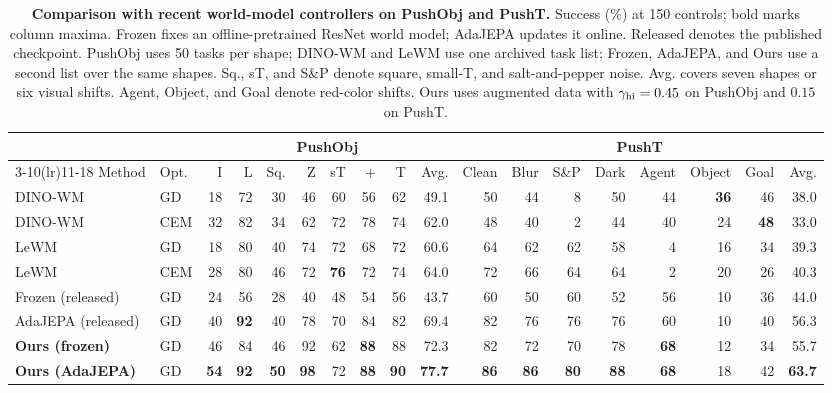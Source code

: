 \begin{table}[t]
\centering
\caption{\textbf{Comparison with recent world-model controllers on PushObj and PushT.} Success (\%) at 150 controls; bold marks column maxima. Frozen fixes an offline-pretrained ResNet world model; AdaJEPA updates it online. Released denotes the published checkpoint. PushObj uses 50 tasks per shape; DINO-WM and LeWM use one archived task list; Frozen, AdaJEPA, and Ours use a second list over the same shapes. Sq., sT, and S\&P denote square, small-T, and salt-and-pepper noise. Avg. covers seven shapes or six visual shifts. Agent, Object, and Goal denote red-color shifts. Ours uses augmented data with $\gamma_{\rm hi}=0.45$ on PushObj and $0.15$ on PushT.}
\label{tab:main}
\small
\setlength{\tabcolsep}{2pt}
\begin{tabular*}{\textwidth}{@{\extracolsep{\fill}}ll*{16}{r}@{}}
\toprule
& &\multicolumn{8}{c}{PushObj}&\multicolumn{8}{c}{PushT}\\
\cmidrule(lr){3-10}\cmidrule(lr){11-18}
Method & Opt. & I & L & Sq. & Z & sT & $+$ & T & Avg. & Clean & Blur & S\&P & Dark & Agent & Object & Goal & Avg.\\
\midrule
DINO-WM~\cite{zhou2025dinowm} & GD & 18 & 72 & 30 & 46 & 60 & 56 & 62 & 49.1 & 50 & 44 & 8 & 50 & 44 & \textbf{36} & 46 & 38.0\\
DINO-WM~\cite{zhou2025dinowm} & CEM & 32 & 82 & 34 & 62 & 72 & 78 & 74 & 62.0 & 48 & 40 & 2 & 44 & 40 & 24 & \textbf{48} & 33.0\\
LeWM~\cite{maes2026lewm} & GD & 18 & 80 & 40 & 74 & 72 & 68 & 72 & 60.6 & 64 & 62 & 62 & 58 & 4 & 16 & 34 & 39.3\\
LeWM~\cite{maes2026lewm} & CEM & 28 & 80 & 46 & 72 & \textbf{76} & 72 & 74 & 64.0 & 72 & 66 & 64 & 64 & 2 & 20 & 26 & 40.3\\
Frozen (released) & GD & 24 & 56 & 28 & 40 & 48 & 54 & 56 & 43.7 & 60 & 50 & 60 & 52 & 56 & 10 & 36 & 44.0\\
AdaJEPA (released) & GD & 40 & \textbf{92} & 40 & 78 & 70 & 84 & 82 & 69.4 & 82 & 76 & 76 & 76 & 60 & 10 & 40 & 56.3\\
\midrule
\textbf{Ours (frozen)} & GD & 46 & 84 & 46 & 92 & 62 & \textbf{88} & 88 & 72.3 & 82 & 72 & 70 & 78 & \textbf{68} & 12 & 34 & 55.7\\
\textbf{Ours (AdaJEPA)} & GD & \textbf{54} & \textbf{92} & \textbf{50} & \textbf{98} & 72 & \textbf{88} & \textbf{90} & \textbf{77.7} & \textbf{86} & \textbf{86} & \textbf{80} & \textbf{88} & \textbf{68} & 18 & 42 & \textbf{63.7}\\
\bottomrule
\end{tabular*}
\end{table}
